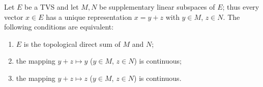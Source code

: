 Let $E$ be a TVS and let $M, N$ be supplementary linear subspaces of $E$; thus every vector $x \in E$ has a unique representation $x = y + z$ with $y \in M$, $z \in N$. The following conditions are equivalent:

\begin{enumerate}
    \item[(a)] $E$ is the topological direct sum of $M$ and $N$;
    \item[(b)] the mapping $y + z \mapsto y$ ($y \in M$, $z \in N$) is continuous;
    \item[(c)] the mapping $y + z \mapsto z$ ($y \in M$, $z \in N$) is continuous.
\end{enumerate}
